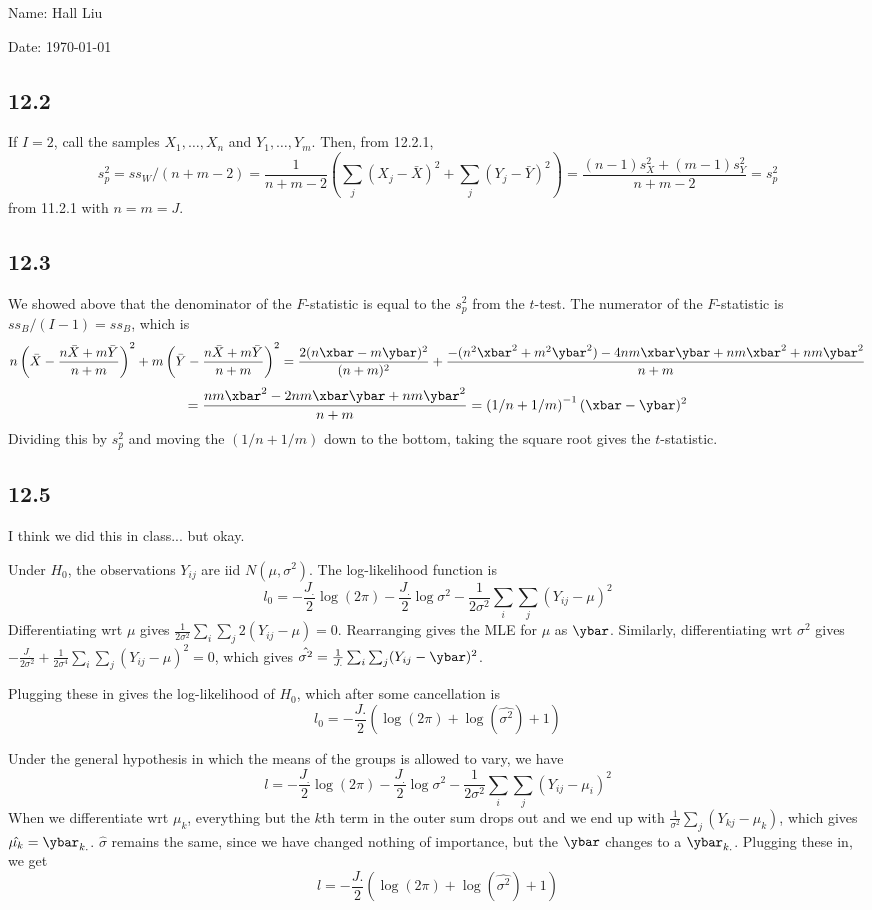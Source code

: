 \documentclass{article}
\begin{document}
Name: Hall Liu

Date: \today 
\vspace{1.5cm}
\subsection*{12.2}
If $I=2$, call the samples $X_1,\ldots,X_n$ and $Y_1,\ldots,Y_m$. Then, from 12.2.1,
$$s_p^2=ss_W/(n+m-2)=\frac{1}{n+m-2}\left(\sum_j(X_j-\bar{X})^2+\sum_j(Y_j-\bar{Y})^2\right)=\frac{(n-1)s_X^2+(m-1)s_Y^2}{n+m-2}=s_p^2$$
from 11.2.1 with $n=m=J$.
\subsection*{12.3}
We showed above that the denominator of the $F$-statistic is equal to the $s_p^2$ from the $t$-test. The numerator of the $F$-statistic is $ss_B/(I-1)=ss_B$, which is 
$$n\left(\bar{X}-\frac{n\bar{X}+m\bar{Y}}{n+m}\right)^2+m\left(\bar{Y}-\frac{n\bar{X}+m\bar{Y}}{n+m}\right)^2=\frac{2(n\xbar-m\ybar)^2}{(n+m)^2}+\frac{-(n^2\xbar^2+m^2\ybar^2)-4nm\xbar\ybar+nm\xbar^2+nm\ybar^2}{n+m}$$
$$=\frac{nm\xbar^2-2nm\xbar\ybar+nm\ybar^2}{n+m}=\left(1/n+1/m\right)^{-1}(\xbar-\ybar)^2$$
Dividing this by $s_p^2$ and moving the $\left(1/n+1/m\right)$ down to the bottom, taking the square root gives the $t$-statistic.
\subsection*{12.5}
I think we did this in class... but okay.

Under $H_0$, the observations $Y_{ij}$ are iid $N(\mu,\sigma^2)$. The log-likelihood function is 
$$l_0=-\frac{J_.}{2}\log(2\pi)-\frac{J_.}{2}\log\sigma^2-\frac{1}{2\sigma^2}\sum_i\sum_j(Y_{ij}-\mu)^2$$
Differentiating wrt $\mu$ gives $\frac{1}{2\sigma^2}\sum_i\sum_j2(Y_{ij}-\mu)=0$. Rearranging gives the MLE for $\mu$ as $\ybar$. Similarly, differentiating wrt $\sigma^2$ gives $-\frac{J_.}{2\sigma^2}+\frac{1}{2\sigma^4}\sum_i\sum_j(Y_{ij}-\hat{\mu})^2=0$, which gives $\hat{\sigma^2}=\frac{1}{J.}\sum_i\sum_j(Y_{ij}-\ybar)^2$.

Plugging these in gives the log-likelihood of $H_0$, which after some cancellation is 
$$l_0=-\frac{J.}{2}(\log(2\pi)+\log(\hat{\sigma^2})+1)$$

Under the general hypothesis in which the means of the groups is allowed to vary, we have 
$$l=-\frac{J_.}{2}\log(2\pi)-\frac{J_.}{2}\log\sigma^2-\frac{1}{2\sigma^2}\sum_i\sum_j(Y_{ij}-\mu_i)^2$$
When we differentiate wrt $\mu_k$, everything but the $k$th term in the outer sum drops out and we end up with $\frac{1}{\sigma^2}\sum_j(Y_{kj}-\mu_k)$, which gives $\hat{\mu_k}=\ybar_{k.}$. $\hat{\sigma}$ remains the same, since we have changed nothing of importance, but the $\ybar$ changes to a $\ybar_{k.}$. Plugging these in, we get 
$$l=-\frac{J.}{2}(\log(2\pi)+\log(\hat{\sigma^2})+1)$$
\end{document}
